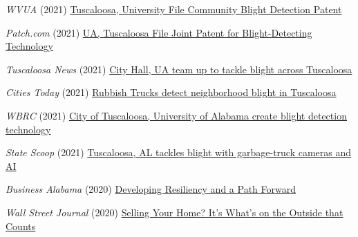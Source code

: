 \documentclass[10pt]{article}
\renewcommand{\section}[1]{\pagebreak[3]%
    \vspace{1.3\baselineskip}%
    \phantomsection\addcontentsline{toc}{section}{#1}%
    \noindent\llap{\scshape\smash{\parbox[t]{\marginparwidth}{\hyphenpenalty=10000\raggedright #1}}}%
    \vspace{-\baselineskip}\par}
\begin{document}
\section{Media}
\begin{outerlist}
\item[] \textit{WVUA} (2021) \href{https://wvua23.com/tuscaloosa-university-file-community-blight-detection-patent/}{Tuscaloosa, University File Community Blight Detection Patent} 
\item[] \textit{Patch.com} (2021) \href{https://patch.com/alabama/tuscaloosa/ua-tuscaloosa-file-joint-patent-blight-detecting-technology}{UA, Tuscaloosa File Joint Patent for Blight-Detecting Technology} 
\item[] \textit{Tuscaloosa News} (2021) \href{https://www.tuscaloosanews.com/story/news/2021/01/31/university-alabama-and-tuscaloosa-city-hall-take-blight/4293132001/}{City Hall, UA team up to tackle blight across Tuscaloosa} 
\item[] \textit{Cities Today} (2021) \href{https://cities-today.com/rubbish-trucks-automatically-detect-neighbourhood-blight-in-tuscaloosa/}{Rubbish Trucks detect neighborhood blight in Tuscaloosa} 
 \item[] \textit{WBRC} (2021) \href{https://www.wbrc.com/2021/02/05/city-tuscaloosa-university-alabama-create-blight-detection-technology/}{City of Tuscaloosa, University of Alabama create blight detection technology} 
\item[] \textit{State Scoop} (2021) \href{https://statescoop.com/tuscaloosa-university-alabama-blight/}{Tuscaloosa, AL tackles blight with garbage-truck cameras and AI} 
\item[] \textit{Business Alabama} (2020) \href{https://businessalabama.com/developing-resiliency-and-a-path-forward/}{Developing Resiliency and a Path Forward} 
\item[] \textit{Wall Street Journal} (2020) \href{https://www.wsj.com/articles/selling-your-home-its-whats-on-the-outside-that-counts-11579792560}{Selling Your Home? It's What's on the Outside that Counts} 

\end{outerlist}
\end{document}
